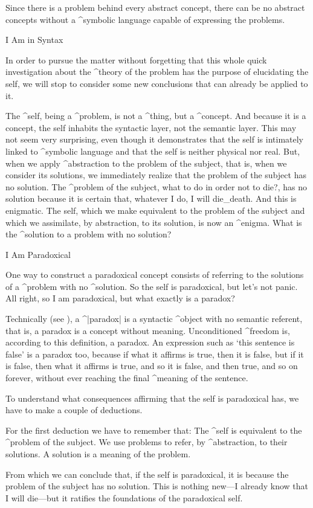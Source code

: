 Since there is a problem behind every abstract concept, there can be no
abstract concepts without a ^{symbolic language} capable of expressing
the problems.


\Section I Am in Syntax

In order to pursue the matter without forgetting that this whole quick
investigation about the ^{theory of the problem} has the purpose of
elucidating the self, we will stop to consider some new conclusions that
can already be applied to it.

The ^{self}, being a ^{problem}, is not a ^{thing}, but a ^{concept}.
And because it is a concept, the self inhabits the syntactic layer, not
the semantic layer. This may not seem very surprising, even though it
demonstrates that the self is intimately linked to ^{symbolic language}
and that the self is neither physical nor real. But, when we apply
^{abstraction} to the problem of the subject, that is, when we consider
its solutions, we immediately realize that the problem of the subject
has no solution. The ^{problem of the subject}, what to do in order not
to die?, has no solution because it is certain that, whatever I do, I
will die_{death}. And this is enigmatic. The self, which we make
equivalent to the problem of the subject and which we assimilate, by
abstraction, to its solution, is now an ^{enigma}. What is the
^{solution} to a problem with no solution?


\Section I Am Paradoxical

One way to construct a paradoxical concept consists of referring to the
solutions of a ^{problem} with no ^{solution}. So the self is
paradoxical, but let's not panic. All right, so I am paradoxical, but
what exactly is a paradox?

Technically (see ), a ^|paradox| is a syntactic ^{object}
with no semantic referent, that is, a paradox is a concept without
meaning. Unconditioned ^{freedom} is, according to this definition, a
paradox. An expression such as `this sentence is false' is a paradox
too, because if what it affirms is true, then it is false, but if it is
false, then what it affirms is true, and so it is false, and then true,
and so on forever, without ever reaching the final ^{meaning} of the
sentence.

To understand what consequences affirming that the self is paradoxical
has, we have to make a couple of deductions.

For the first deduction we have to remember that:
\point The ^{self} is equivalent to the ^{problem of the subject}.
\point We use problems to refer, by ^{abstraction}, to their solutions.
\point A solution is a meaning of the problem.
\par\noindent From which we can conclude that, if the self is paradoxical,
it is because the problem of the subject has no solution. This is
nothing new---I already know that I will die---but it ratifies the
foundations of the paradoxical self.

